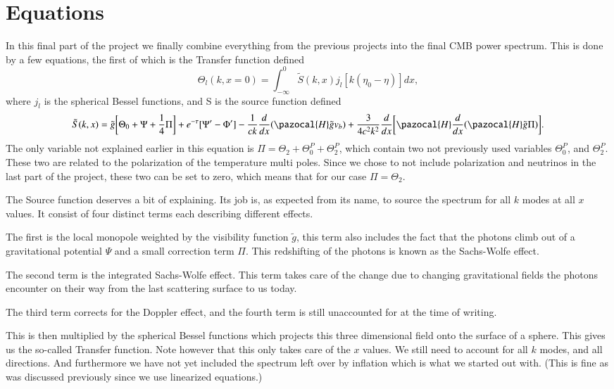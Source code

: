 \documentclass[a4paper]{report}
\begin{document}
\section{Equations}\label{sec:Equations}
In this final part of the project we finally combine everything from the previous projects into the final CMB power spectrum. This is done by a few equations, the first of which is the Transfer function defined
\begin{equation}
 \Theta_l(k,x=0)=\int^0_{-\infty} \tilde{S}(k,x)j_l[k(\eta_0-\eta)]dx,
\end{equation}
where $j_l$ is the spherical Bessel functions, and S is the source function defined
\begin{equation}
 \tilde{S}(k,x) = \tilde{g}\bigg[\Theta_0+\Psi+\frac{1}{4}\Pi\bigg]+e^{-\tau}[\Psi^\prime-\Phi^\prime]-\frac{1}{ck}\frac{d}{dx}(\pazocal{H}\tilde{g}v_b) +\frac{3}{4c^2k^2}\frac{d}{dx}\bigg[\pazocal{H}\frac{d}{dx}(\pazocal
{H}\tilde{g}\Pi) \bigg].
\end{equation}
The only variable not explained earlier in this equation is $\Pi = \Theta_2 +\Theta_0^P+\Theta_2^P$, which contain two not previously used variables $\Theta_0^P$, and $\Theta_2^P$. These two are related to the polarization of the temperature multi poles. Since we chose to not include polarization and neutrinos in the last part of the project, these two can be set to zero, which means that for our case $\Pi = \Theta_2$.

The Source function deserves a bit of explaining. Its job is, as expected from its name, to source the spectrum for all $k$ modes at all $x$ values. It consist of four distinct terms each describing different effects. 

The first is the local monopole weighted by the visibility function $\tilde{g}$, this term also includes the fact that the photons climb out of a gravitational potential $\Psi$ and a small correction term $\Pi$. This redshifting of the photons is known as the Sachs-Wolfe effect. 

The second term is the integrated Sachs-Wolfe effect. This term takes care of the change due to changing gravitational fields the photons encounter on their way from the last scattering surface to us today.

The third term corrects for the Doppler effect, and the fourth term is still unaccounted for at the time of writing.


This is then multiplied by the spherical Bessel functions which projects this three dimensional field onto the surface of a sphere. This gives us the so-called Transfer function. Note however that this only takes care of the $x$ values. We still need to account for all $k$ modes, and all directions. And furthermore we have not yet included the spectrum left over by inflation which is what we started out with. (This is fine as was discussed previously since we use linearized equations.)
\end{document}
